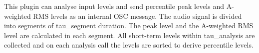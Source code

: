 This plugin can analyse input levels and send percentile peak levels and A-weighted RMS levels as an internal OSC message. The audio signal is divided into segments of tau_segment duration. The peak level and the A-weighted RMS level are calculated in each segment. All short-term levels within tau_analysis are collected and on each analysis call the levels are sorted to derive percentile levels.



